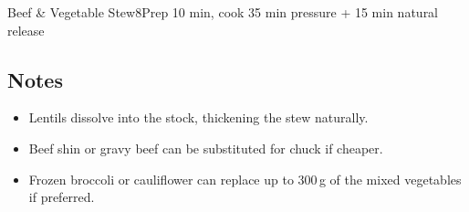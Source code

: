 \begin{recipebox}{Beef \& Vegetable Stew}{8}{Prep 10 min, cook 35 min pressure + 15 min natural release}
\subsection*{Notes}
\begin{itemize}
    \item Lentils dissolve into the stock, thickening the stew naturally.
    \item Beef shin or gravy beef can be substituted for chuck if cheaper.
    \item Frozen broccoli or cauliflower can replace up to 300\,g of the mixed vegetables if preferred.
\end{itemize}
\end{recipebox}
